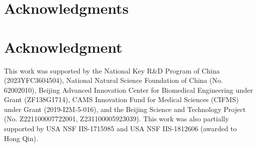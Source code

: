 \documentclass[10pt,journal,compsoc]{IEEEtran}
\begin{document}
\ifCLASSOPTIONcompsoc
  \section*{Acknowledgments}
\else
  \section*{Acknowledgment}
\fi

{This work was supported by the National Key R\&D Program of China (2023YFC3604504), National Natural Science Foundation of China (No. 62002010), Beijing Advanced Innovation Center for Biomedical Engineering under Grant (ZF138G1714), CAMS Innovation Fund for Medical Sciences (CIFMS) under Grant (2019-I2M-5-016), and the Beijing Science and Technology Project (No. Z221100007722001, Z231100005923039). This work was also partially supported by USA NSF IIS-1715985 and USA NSF IIS-1812606 (awarded to Hong Qin).
}


\ifCLASSOPTIONcaptionsoff
	\newpage
\fi




\end{document}
